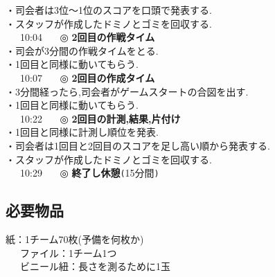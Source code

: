 \hspace{15mm}・司会者は3位〜1位のスコアを口頭で発表する.\\
\hspace{15mm}・スタッフが作成したドミノとゴミを回収する.\\
\ \ \ 10:04 \ \ \ ◎ \textbf{2回目の作戦タイム}\\
\hspace{15mm}・司会が3分間の作戦タイムをとる.\\
\hspace{15mm}・1回目と同様に動いてもらう.\\
\ \ \ 10:07 \ \ \ ◎ \textbf{2回目の作成タイム}\\
\hspace{15mm}・3分間経ったら,司会者がゲームスタートの合図を出す.\\
\hspace{15mm}・1回目と同様に動いてもらう.\\
\ \ \ 10:22 \ \ \ ◎ \textbf{2回目の計測,結果,片付け}\\
\hspace{15mm}・1回目と同様に計測し順位を発表.\\
\hspace{15mm}・司会者は1回目と2回目のスコアを足し高い順から発表する.\\
\hspace{15mm}・スタッフが作成したドミノとゴミを回収する.\\
\ \ \ 10:29 \ \ \ ◎ \textbf{終了し休憩}\verb+(+15分間\verb+)+

\subsection{必要物品}
紙：1チーム70枚(予備を何枚か)\\
\ \ \ ファイル：1チーム1つ\\
\ \ \ ビニール紐：長さを測るために1玉
